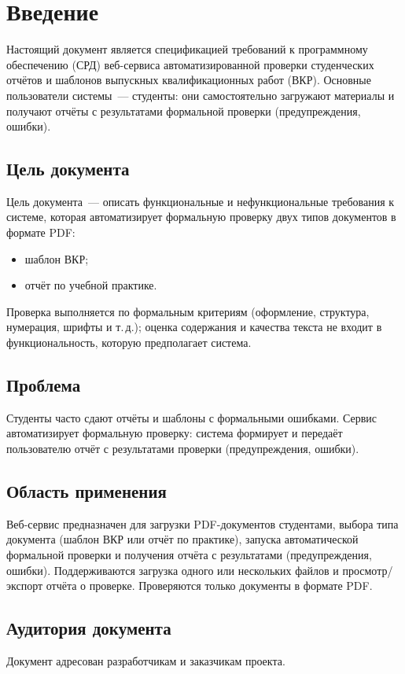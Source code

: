 \section{Введение}

Настоящий документ является спецификацией требований к программному обеспечению (СРД) веб-сервиса автоматизированной проверки студенческих отчётов и шаблонов выпускных квалификационных работ (ВКР). Основные пользователи системы~--- студенты: они самостоятельно загружают материалы и получают отчёты с результатами формальной проверки (предупреждения, ошибки).

\subsection{Цель документа}

Цель документа~--- описать функциональные и нефункциональные требования к системе, которая автоматизирует формальную проверку двух типов документов в формате PDF:
\begin{itemize}
  \item шаблон ВКР;
  \item отчёт по учебной практике.
\end{itemize}
Проверка выполняется по формальным критериям (оформление, структура, нумерация, шрифты и т.\,д.); оценка содержания и качества текста не входит в функциональность, которую предполагает система.

\subsection{Проблема}

Студенты часто сдают отчёты и шаблоны с формальными ошибками. Сервис автоматизирует формальную проверку: система формирует и передаёт пользователю отчёт с результатами проверки (предупреждения, ошибки).

\subsection{Область применения}

Веб-сервис предназначен для загрузки PDF-документов студентами, выбора типа документа (шаблон ВКР или отчёт по практике), запуска автоматической формальной проверки и получения отчёта с результатами (предупреждения, ошибки). Поддерживаются загрузка одного или нескольких файлов и просмотр/экспорт отчёта о проверке. Проверяются только документы в формате PDF.

\subsection{Аудитория документа}

Документ адресован разработчикам и заказчикам проекта.
